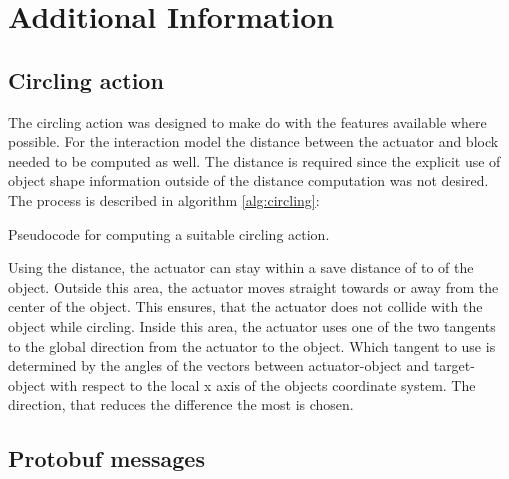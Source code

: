 \chapter{Additional Information}

\section{Circling action \label{sec:circling}}

The circling action was designed to make do with the features available where possible.
For the interaction model the distance between the actuator and block needed to be computed as well. The distance is required since the explicit use of object shape information outside of the distance computation was not desired. 
The process is described in algorithm \ref{alg:circling}:

\begin{algorithm}
\begin{algorithmic}[1]
\Statex
{} 
\Else 
\EndIf
\State {}
\Statex
{}
	\State {}
\EndFunction
\end{algorithmic}
\caption{Pseudocode for computing a suitable circling action.}
\label{alg:circling}
\end{algorithm}


Using the distance, the actuator can stay within a save distance of  to  of the object. Outside this area, the actuator moves straight towards or away from the center of the object. This ensures, that the actuator does not collide with the object while circling.
Inside this area, the actuator uses one of the two tangents to the global direction from the actuator to the object. Which tangent to use is determined by the angles of the vectors between actuator-object and target-object with respect to the local x axis of the objects coordinate system. 
The direction, that reduces the difference the most is chosen.

\section{Protobuf messages \label{sec:protobufMessages}}

